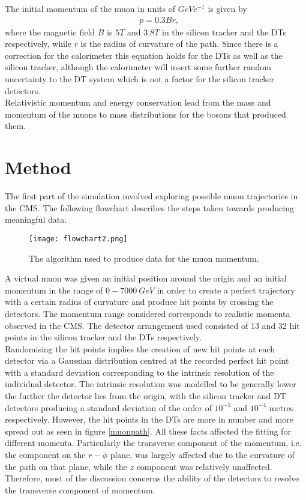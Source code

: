 \documentclass{article}
\begin{document}
The initial momentum of the muon in units of $GeVc^{-1}$ is given by
\begin{align}
&p=0.3Br,\label{curvature}
\end{align}
where the magnetic field $B$ is $5T$ and $3.8T$ in the silicon tracker and the DTs respectively, while $r$ is the radius of curvature of the path. Since there is a correction for the calorimeter this equation holds for the DTs as well as the silicon tracker, although the calorimeter will insert some further random uncertainty to the DT system which is not a factor for the silicon tracker detectors.\\

Relativistic momentum and energy conservation lead from the mass and momentum of the muons to mass distributions for the bosons that produced them.

\section*{Method}

The first part of the simulation involved exploring possible muon trajectories in the CMS. The following flowchart describes the steps taken towards producing meaningful data.

\begin{figure}[h]
\centering
\texttt{[image: flowchart2.png]}
\caption{The algorithm used to produce data for the muon momentum.}
	\label{flowchart}
\end{figure}

A virtual muon was given an initial position around the origin and an initial momentum in the range of $0 - 7000\  GeV$ in order to create a perfect trajectory with a certain radius of curvature and produce hit points by crossing the detectors. The momentum range considered corresponds to realistic momenta observed in the CMS. The detector arrangement used consisted of 13 and 32 hit points in the silicon tracker and the DTs respectively.\\

Randomising the hit points implies the creation of new hit points at each detector via a Gaussian distribution centred at the recorded perfect hit point with a standard deviation corresponding to the intrinsic resolution of the individual detector. The intrinsic resolution was modelled to be generally lower the further the detector lies from the origin, with the silicon tracker and DT detectors producing a standard deviation of the order of $10^{-5}$ and $10^{-4}$ metres respectively. However, the hit points in the DTs are more in number and more spread out as seen in figure \ref{muonpath}. All these facts affected the fitting for different momenta. Particularly the transverse component of the momentum, i.e. the component on the $r-\phi$ plane, was largely affected due to the curvature of the path on that plane, while the $z$ component was relatively unaffected. Therefore, most of the discussion concerns the ability of the detectors to resolve the transverse component of momentum.\\
\end{document}
